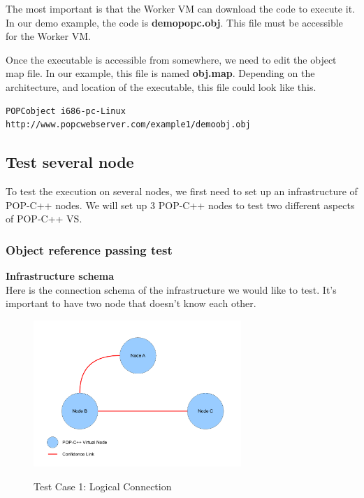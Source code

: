 The most important is that the Worker VM can download the code to execute it. In our demo example, the code is \textbf{demopopc.obj}. This file must be accessible for the Worker VM. \s

Once the executable is accessible from somewhere, we need to edit the object map file. In our example, this file is named \textbf{obj.map}. Depending on the architecture, and location of the executable, this file could look like this. \s
\begin{lstlisting}
POPCobject i686-pc-Linux http://www.popcwebserver.com/example1/demoobj.obj
\end{lstlisting}



\pagebreak
\subsection{Test several node}
To test the execution on several nodes, we first need to set up an infrastructure of POP-C++ nodes. We will set up 3 POP-C++ nodes to test two different aspects of POP-C++ VS.


%
%
\subsubsection{Object reference passing test}

\textbf{Infrastructure schema}\\
Here is the connection schema of the infrastructure we would like to test. It's important to have two node that doesn't know each other. 
\begin{figure}[ht]
	\caption{Test Case 1: Logical Connection}
  	\centering
	\includegraphics[width=0.7\textwidth]{./pic/testcase2.pdf}
	\label{fig:testcase1}
\end{figure}

